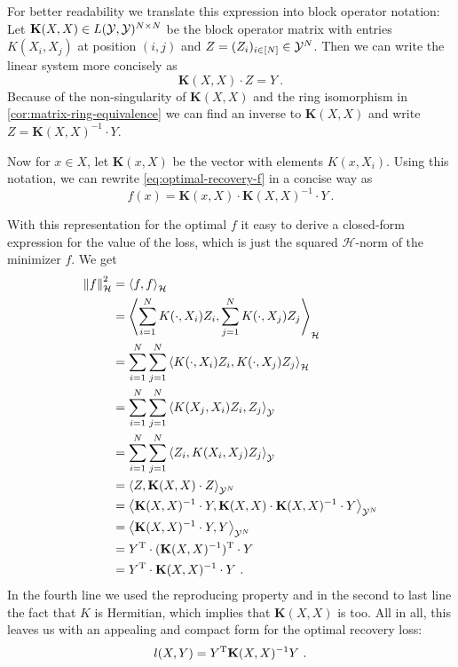 For better readability we translate this expression into block operator notation:
Let $\mathbf{K}(X, X) \in L(\mathcal{Y}, \mathcal{Y})^{N\times N}$ be the block operator matrix with entries $K(X_i, X_j)$ at position $(i, j)$ and $Z = (Z_i)_{i \in [N]} \in \mathcal{Y}^N$.
Then we can write the linear system more concisely as 
\begin{equation}
	\mathbf{K}(X, X) \cdot Z = Y \ .
\end{equation}
Because of the non-singularity of $\mathbf{K}(X, X)$ and the ring isomorphism in \cref{cor:matrix-ring-equivalence} we can find an inverse to $\mathbf{K}(X, X)$ and write $Z = \mathbf{K}(X, X)^{-1} \cdot Y$.

Now for $x \in X$, let $\mathbf{K}(x, X)$ be the vector with elements $K(x, X_i)$.
Using this notation, we can rewrite \cref{eq:optimal-recovery-f} in a concise way as
\begin{equation}
	f(x) = \mathbf{K}(x, X) \cdot \mathbf{K}(X, X)^{-1} \cdot Y \ .
\end{equation}

With this representation for the optimal $f$ it easy to derive a closed-form expression for the value of the loss, which is just the squared $\mathcal{H}$-norm of the minimizer $f$.
We get
\begingroup
\allowdisplaybreaks
\begin{align}
	\norm{f}_\mathcal{H}^2 &= \left< f, f\right>_\mathcal{H}\\
	&= \left< \sum_{i=1}^N K(\cdot, X_i) Z_i, \sum_{j=1}^N K(\cdot, X_j) Z_j \right>_\mathcal{H}\\
	&= \sum_{i=1}^N \sum_{j=1}^N \left< K(\cdot, X_i) Z_i, K(\cdot, X_j) Z_j \right>_\mathcal{H}\\
	&= \sum_{i=1}^N \sum_{j=1}^N \left< K(X_j, X_i)Z_i, Z_j \right>_{\mathcal{Y}}\\
	&= \sum_{i=1}^N \sum_{j=1}^N \left< Z_i, K(X_i, X_j) Z_j \right>_{\mathcal{Y}}\\
	&= \left< Z, \mathbf{K}(X, X) \cdot Z\right >_{\mathcal{Y}^N}\\
	&= \left< \mathbf{K}(X, X)^{-1} \cdot Y, \mathbf{K}(X, X) \cdot \mathbf{K}(X, X)^{-1} \cdot Y\right >_{\mathcal{Y}^N} \\
	&= \left< \mathbf{K}(X, X)^{-1} \cdot Y,  Y\right >_{\mathcal{Y}^N}\\
	&= Y^{\mathrm{T}} \cdot (\mathbf{K}(X, X)^{-1})^{\mathrm{T}} \cdot Y\\
	&=  Y^{\mathrm{T}} \cdot \mathbf{K}(X, X)^{-1} \cdot Y \ .
\end{align}
\endgroup
In the fourth line we used the reproducing property and in the second to last line the fact that $K$ is Hermitian, which implies that $\mathbf{K}(X, X)$ is too.
All in all, this leaves us with an appealing and compact form for the optimal recovery loss:
\begin{equation}
	\label{eq:optimal-recovery-loss-closed-form}
	l(X, Y) = Y^{\mathrm{T}} \mathbf{K}(X, X)^{-1} Y \ .
\end{equation}

